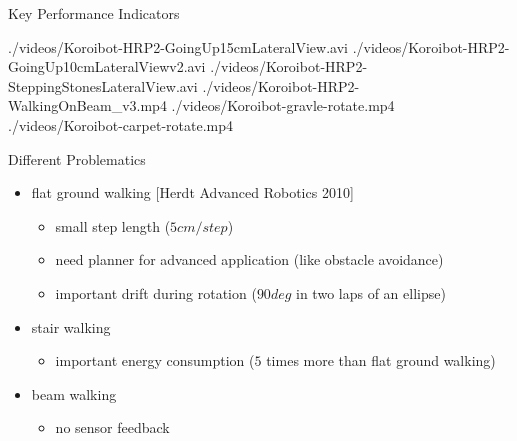 \begin{frame}{Key Performance Indicators}
  \begin{center}
    {./videos/Koroibot-HRP2-GoingUp15cmLateralView.avi}
    {./videos/Koroibot-HRP2-GoingUp10cmLateralViewv2.avi}
    {./videos/Koroibot-HRP2-SteppingStonesLateralView.avi}
    {./videos/Koroibot-HRP2-WalkingOnBeam_v3.mp4}
    {./videos/Koroibot-gravle-rotate.mp4}
    {./videos/Koroibot-carpet-rotate.mp4}
    
  \end{center}
\end{frame}
\begin{frame}{Different Problematics}

\begin{itemize}
  \item flat ground walking [Herdt Advanced Robotics 2010]
  \begin{itemize}
    \item small step length ($5cm/step$)
    \item need planner for advanced application (like obstacle avoidance)
    \item important drift during rotation ($90deg$ in two laps of an ellipse)
  \end{itemize}
  
  \item stair walking
  \begin{itemize}
    \item important energy consumption ($5$ times more than flat ground walking)
  \end{itemize}
  
  \item beam walking
  \begin{itemize}
    \item no sensor feedback
  \end{itemize}
\end{itemize}
\end{frame}